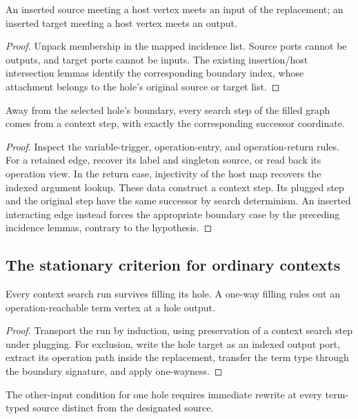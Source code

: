 \begin{lemma}
An inserted source meeting a host vertex meets an input of the replacement;
an inserted target meeting a host vertex meets an output.
\end{lemma}
\begin{proof}
Unpack membership in the mapped incidence list. Source ports cannot be outputs,
and target ports cannot be inputs. The existing insertion/host intersection
lemmas identify the corresponding boundary index, whose attachment belongs to
the hole's original source or target list.
\end{proof}


\begin{theorem}
Away from the selected hole's boundary, every search step of the filled graph
comes from a context step, with exactly the corresponding successor coordinate.
\end{theorem}
\begin{proof}
Inspect the variable-trigger, operation-entry, and operation-return rules.
For a retained edge, recover its label and singleton source, or read back its
operation view. In the return case, injectivity of the host map recovers the
indexed argument lookup. These data construct a context step. Its plugged
step and the original step have the same successor by search determinism.
An inserted interacting edge instead forces the appropriate boundary case by
the preceding incidence lemmas, contrary to the hypothesis.
\end{proof}


\subsection{The stationary criterion for ordinary contexts}

\begin{lemma}
Every context search run survives filling its hole. A one-way filling rules
out an operation-reachable term vertex at a hole output.
\end{lemma}
\begin{proof}
Transport the run by induction, using preservation of a context search step
under plugging. For exclusion, write the hole target as an indexed output
port, extract its operation path inside the replacement, transfer the term
type through the boundary signature, and apply one-wayness.
\end{proof}
The other-input condition for one hole requires immediate rewrite at every
term-typed source distinct from the designated source.


